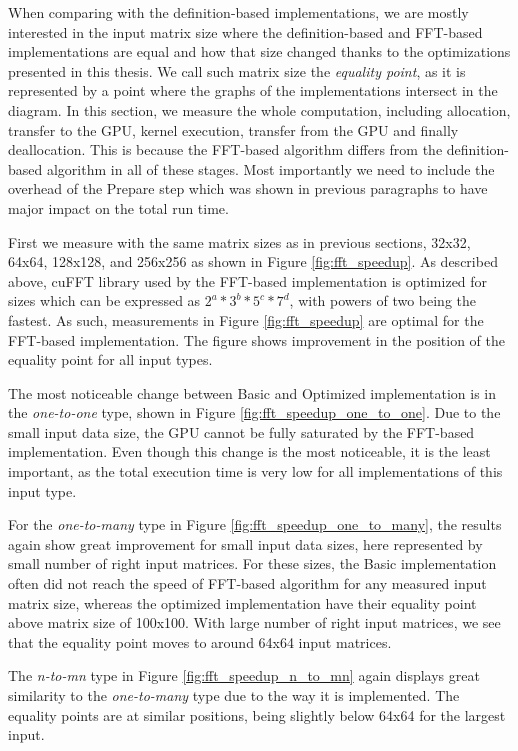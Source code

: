 When comparing with the definition-based implementations, we are mostly interested in the input matrix size where the definition-based and FFT-based implementations are equal and how that size changed thanks to the optimizations presented in this thesis. We call such matrix size the \textit{equality point}, as it is represented by a point where the graphs of the implementations intersect in the diagram. In this section, we measure the whole computation, including allocation, transfer to the GPU, kernel execution, transfer from the GPU and finally deallocation. This is because the FFT-based algorithm differs from the definition-based algorithm in all of these stages. Most importantly we need to include the overhead of the Prepare step which was shown in previous paragraphs to have major impact on the total run time.

First we measure with the same matrix sizes as in previous sections, 32x32, 64x64, 128x128, and 256x256 as shown in Figure \ref{fig:fft_speedup}. As described above, cuFFT library used by the FFT-based implementation is optimized for sizes which can be expressed as $2^{a}*3^{b}*5^{c}*7^{d}$, with powers of two being the fastest. As such, measurements in Figure \ref{fig:fft_speedup} are optimal for the FFT-based implementation. The figure shows improvement in the position of the equality point for all input types.

The most noticeable change between Basic and Optimized implementation is in the \textit{one-to-one} type, shown in Figure \ref{fig:fft_speedup_one_to_one}. Due to the small input data size, the GPU cannot be fully saturated by the FFT-based implementation. Even though this change is the most noticeable, it is the least important, as the total execution time is very low for all implementations of this input type. 

For the \textit{one-to-many} type in Figure \ref{fig:fft_speedup_one_to_many}, the results again show great improvement for small input data sizes, here represented by small number of right input matrices. For these sizes, the Basic implementation often did not reach the speed of FFT-based algorithm for any measured input matrix size, whereas the optimized implementation have their equality point above matrix size of 100x100. With large number of right input matrices, we see that the equality point moves to around 64x64 input matrices.

The \textit{n-to-mn} type in Figure \ref{fig:fft_speedup_n_to_mn} again displays great similarity to the \textit{one-to-many} type due to the way it is implemented. The equality points are at similar positions, being slightly below 64x64 for the largest input.

